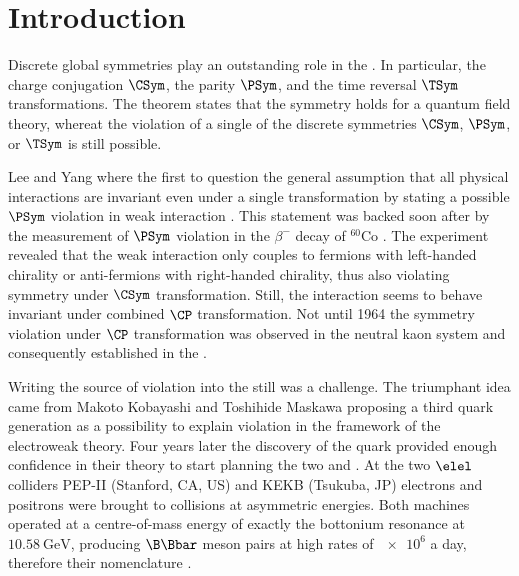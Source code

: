 
\chapter{Introduction}
\label{ch:introduction}



Discrete global symmetries play an outstanding role in the \SM. In particular,
the charge conjugation $\CSym$, the parity $\PSym$, and the time reversal
$\TSym$ transformations. The \CPT theorem \cite{set:cpt} states that the \CPT
symmetry holds for a quantum field theory, whereat the violation of a single of
the discrete symmetries $\CSym$, $\PSym$, or $\TSym$ is still possible.

Lee and Yang where the first to question the general assumption that all
physical interactions are invariant even under a single transformation by
stating a possible $\PSym$ violation in weak interaction \cite{Lee:1956qn}. This
statement was backed soon after by the measurement of $\PSym$ violation in the
$\beta^{-}$ decay of ${}^{60}\text{Co}$ \cite{Wu:1957my}. The experiment
revealed that the weak interaction only couples to fermions with left-handed
chirality or anti-fermions with right-handed chirality, thus also violating
symmetry under $\CSym$ transformation. Still, the interaction seems to behave
invariant under combined $\CP$ transformation. Not until 1964 the symmetry
violation under $\CP$ transformation was observed in the neutral kaon system
\cite{Christenson:1964fg} and consequently established in the \SM.

Writing the source of \CP violation into the \SM still was a challenge. The
triumphant idea came from Makoto Kobayashi and Toshihide Maskawa
\cite{Kobayashi:1973fv} proposing a third quark generation as a possibility to
explain \CP violation in the framework of the electroweak theory. Four years
later the discovery of the \bquark quark \cite{Herb:1977ek} provided enough
confidence in their theory to start planning the two \BFactories \Babar and
\Belle. At the two $\elel$ colliders PEP-II (Stanford, CA, US) and KEKB
(Tsukuba, JP) electrons and positrons were brought to collisions at asymmetric
energies. Both machines operated at a centre-of-mass energy of exactly the
\YFourS bottonium resonance at $\SI{10.58}{\GeV}$, producing $\B\Bbar$ meson
pairs at high rates of $\num{e6}$ a day, therefore their nomenclature
\cite{Bevan:2014iga}.

